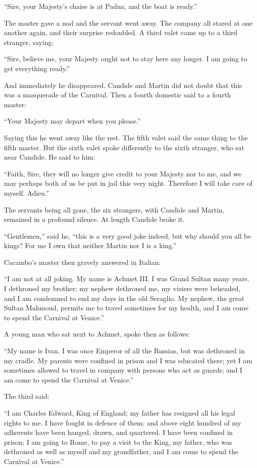 ``Sire, your Majesty's chaise is at Padua, and the boat is ready.''

The master gave a nod and the servant went away. The company all stared at one another again, and their surprise redoubled. A third valet came up to a third stranger, saying:

``Sire, believe me, your Majesty ought not to stay here any longer. I am going to get everything ready.''

And immediately he disappeared. Candide and Martin did not doubt that this was a masquerade of the Carnival. Then a fourth domestic said to a fourth master:

``Your Majesty may depart when you please.''

Saying this he went away like the rest. The fifth valet said the same thing to the fifth master. But the sixth valet spoke differently to the sixth stranger, who sat near Candide. He said to him:

``Faith, Sire, they will no longer give credit to your Majesty nor to me, and we may perhaps both of us be put in jail this very night. Therefore I will take care of myself. Adieu.''

The servants being all gone, the six strangers, with Candide and Martin, remained in a profound silence. At length Candide broke it.

``Gentlemen,'' said he, ``this is a very good joke indeed, but why should you all be kings? For me I own that neither Martin nor I is a king.''

Cacambo's master then gravely answered in Italian:

``I am not at all joking. My name is Achmet III. I was Grand Sultan many years. I dethroned my brother; my nephew dethroned me, my viziers were beheaded, and I am condemned to end my days in the old Seraglio. My nephew, the great Sultan Mahmoud, permits me to travel sometimes for my health, and I am come to spend the Carnival at Venice.''

A young man who sat next to Achmet, spoke then as follows:

``My name is Ivan. I was once Emperor of all the Russias, but was dethroned in my cradle. My parents were confined in prison and I was educated there; yet I am sometimes allowed to travel in company with persons who act as guards; and I am come to spend the Carnival at Venice.''

The third said:

``I am Charles Edward, King of England; my father has resigned all his legal rights to me. I have fought in defence of them; and above eight hundred of my adherents have been hanged, drawn, and quartered. I have been confined in prison; I am going to Rome, to pay a visit to the King, my father, who was dethroned as well as myself and my grandfather, and I am come to spend the Carnival at Venice.''

